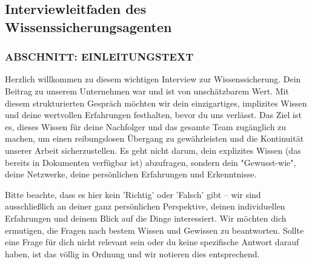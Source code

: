 \documentclass[
  10pt,
  ngerman,
  a4paper,
  toc=graduated,
  numbers=noenddot,
  headings=standardclasses,
  nonumberlist
]{scrartcl}
\begin{document}
\makeatletter
{}
\makeatother

\setcounter{section}{1}
\setcounter{subsection}{0}



\subsection{Interviewleitfaden des Wissenssicherungsagenten}
\label{anhang_interviewleitfaden}

\subsubsection*{ABSCHNITT: EINLEITUNGSTEXT}

Herzlich willkommen zu diesem wichtigen Interview zur Wissenssicherung. Dein Beitrag zu unserem Unternehmen war und ist von unschätzbarem Wert. Mit diesem strukturierten Gespräch möchten wir dein einzigartiges, implizites Wissen und deine wertvollen Erfahrungen festhalten, bevor du uns verlässt. Das Ziel ist es, dieses Wissen für deine Nachfolger und das gesamte Team zugänglich zu machen, um einen reibungslosen Übergang zu gewährleisten und die Kontinuität unserer Arbeit sicherzustellen. Es geht nicht darum, dein explizites Wissen (das bereits in Dokumenten verfügbar ist) abzufragen, sondern dein "Gewusst-wie", deine Netzwerke, deine persönlichen Erfahrungen und Erkenntnisse.

Bitte beachte, dass es hier kein 'Richtig' oder 'Falsch' gibt – wir sind ausschließlich an deiner ganz persönlichen Perspektive, deinen individuellen Erfahrungen und deinem Blick auf die Dinge interessiert. Wir möchten dich ermutigen, die Fragen nach bestem Wissen und Gewissen zu beantworten. Sollte eine Frage für dich nicht relevant sein oder du keine spezifische Antwort darauf haben, ist das völlig in Ordnung und wir notieren dies entsprechend.
\end{document}
